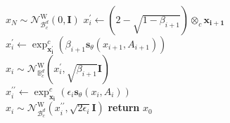 \documentclass[letterpaper]{article} %
\begin{document}
\begin{algorithm}[t]
\caption{Hyperbolic PC sampling (VP SDE)}
\label{alg:algorithm2}
\begin{algorithmic}[1] %
\STATE $x_N\sim \mathcal{N}_{\mathcal{B}_{c}^{d}}^{\mathrm{W}}(0, \mathbf{I})$
\STATE $x^\prime_i \gets (2-\sqrt{1-\beta_{i+1}})\otimes_c\boldsymbol{x_{i+1}}$\\
\STATE $x^\prime_i \gets \exp _{\boldsymbol{x^\prime_i}}^{c}(\beta_{i+1}\boldsymbol{s}_\theta(x_{i+1},A_{i+1}))$\\
\STATE $x_i\sim \mathcal{N}_{\mathbb{B}_{c}^{d}}^{\mathrm{W}}(x^\prime_i,\sqrt{\beta_{i+1}} \mathbf{I})$\\
\STATE $x^{\prime\prime}_i \gets  \exp_{\boldsymbol{x_{i}}}^{c}(\epsilon_i\boldsymbol{s}_\theta(x_{i},A_{i}))$ \\
\STATE $x_i \sim \mathcal{N}_{\mathcal{B}_{c}^{d}}^{\mathrm{W}}(x^{\prime\prime}_i,\sqrt{2\epsilon_i} \mathbf{I}) $
\ENDFOR
\ENDFOR
\STATE \textbf{return} $x_0$
\end{algorithmic}
\end{algorithm}
\end{document}
